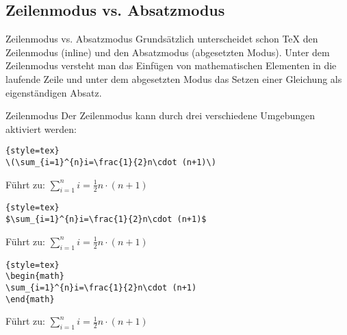 \subsection{Zeilenmodus vs. Absatzmodus}
\begin{frame}[fragile]{Zeilenmodus vs. Absatzmodus}	
Grundsätzlich unterscheidet schon \TeX{} den Zeilenmodus (inline) und den Absatzmodus (abgesetzten Modus). Unter dem Zeilenmodus versteht man das Einfügen von mathematischen Elementen in die laufende Zeile und unter dem abgesetzten Modus das Setzen einer Gleichung als eigenständigen Absatz.



\end{frame}

\begin{frame}[fragile]{Zeilenmodus}
Der Zeilenmodus kann durch drei verschiedene Umgebungen aktiviert werden:
\begin{lstlisting}[mathescape=true]{style=tex}
\(\sum_{i=1}^{n}i=\frac{1}{2}n\cdot (n+1)\)
\end{lstlisting}
Führt zu: \(\sum_{i=1}^{n}i=\frac{1}{2}n\cdot (n+1)\)
\begin{lstlisting}[mathescape=false]{style=tex}
$\sum_{i=1}^{n}i=\frac{1}{2}n\cdot (n+1)$
\end{lstlisting}
Führt zu: $\sum_{i=1}^{n}i=\frac{1}{2}n\cdot (n+1)$
\begin{lstlisting}[mathescape=false]{style=tex}
\begin{math}
\sum_{i=1}^{n}i=\frac{1}{2}n\cdot (n+1)
\end{math}
\end{lstlisting}
Führt zu:
\begin{math}
\sum_{i=1}^{n}i=\frac{1}{2}n\cdot (n+1)
\end{math}
\end{frame}

